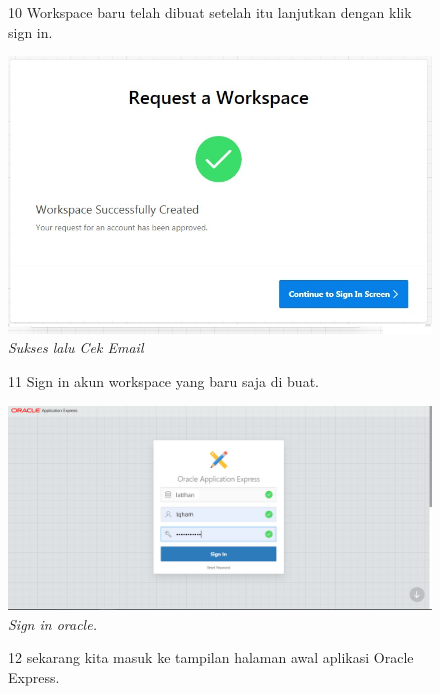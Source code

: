 \begin{enumerate}
\begin{figure}
\item[10] Workspace baru telah dibuat setelah itu lanjutkan dengan klik sign in.

    \begin{center}
\includegraphics[scale=0.5]{figures/pict(5).jpg}
    \caption{\textit{Sukses lalu Cek Email}}
        \end{center}
\label{gambar}
\end{figure}

\begin{figure}
\item[11] Sign in akun workspace yang baru saja di buat.

    \begin{center}
\includegraphics[scale=0.5]{figures/apex.jpg}
    \caption{\textit{Sign in oracle.}}
        \end{center}
\label{gambar}
\end{figure}

\begin{figure}
\item[12] sekarang kita masuk ke tampilan halaman awal aplikasi Oracle Express.


\end{figure}
\end{enumerate}
